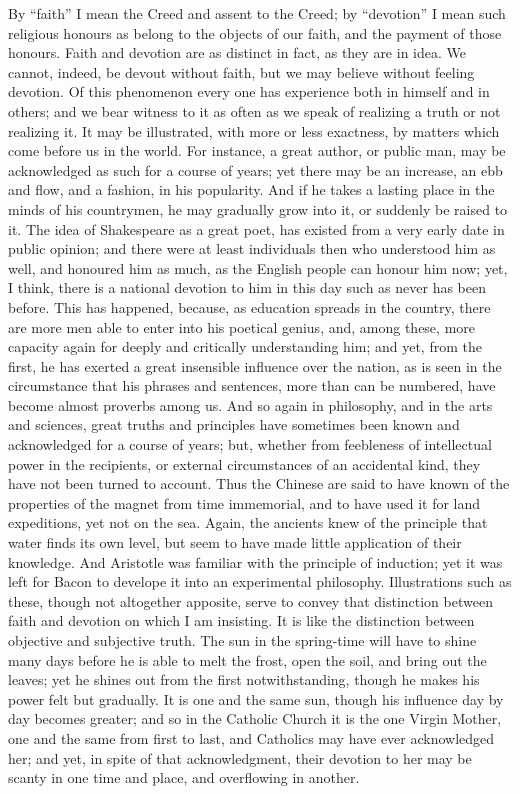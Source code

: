 By ``faith'' I mean the Creed and assent to the Creed; by
``devotion'' I mean such religious honours as belong to the
objects of our faith, and the payment of those honours. Faith and
devotion are as distinct in fact, as they are in idea. We cannot,
indeed, be devout without faith, but we may believe without feeling
devotion. Of this phenomenon every one has experience both in himself
and in others; and we bear witness to it as often as we speak of
realizing a truth or not realizing it. It may be illustrated, with more
or less exactness, by matters which come before us in the world. For
instance, a great author, or public man, may be acknowledged as such for
a course of years; yet there may be an increase, an ebb and flow, and a
fashion, in his popularity. And if he takes a lasting place in the
minds of his countrymen, he may gradually grow into it, or suddenly be
raised to it. The idea of Shakespeare as a great poet, has existed from
a very early date in public opinion; and there were at least individuals
then who understood him as well, and honoured him as much, as the
English people can honour him now; yet, I think, there is a national
devotion to him in this day such as never has been before. This has
happened, because, as education spreads in the country, there are more
men able to enter into his poetical genius, and, among these, more
capacity again for deeply and critically understanding him; and yet,
from the first, he has exerted a great insensible influence over the
nation, as is seen in the circumstance that his phrases and sentences,
more than can be numbered, have become almost proverbs among us. And so
again in philosophy, and in the arts and sciences, great truths and
principles have sometimes been known and acknowledged for a course of
years; but, whether from feebleness of intellectual power in the
recipients, or external circumstances of an accidental kind, they have
not been turned to account. Thus the Chinese are said to have known of
the properties of the magnet from time immemorial, and to have used it
for land expeditions, yet not on the sea. Again, the ancients knew of
the principle that water finds its own level, but seem to have made
little application of their knowledge. And Aristotle was familiar with
the principle of induction; yet it was left for Bacon to develope it
into an experimental philosophy. Illustrations such as these, though not
altogether apposite, serve to convey that distinction between faith
and devotion on which I am insisting. It is like the distinction between
objective and subjective truth. The sun in the spring-time will have to
shine many days before he is able to melt the frost, open the soil, and
bring out the leaves; yet he shines out from the first notwithstanding,
though he makes his power felt but gradually. It is one and the same
sun, though his influence day by day becomes greater; and so in the
Catholic Church it is the one Virgin Mother, one and the same from first
to last, and Catholics may have ever acknowledged her; and yet, in spite
of that acknowledgment, their devotion to her may be scanty in one time
and place, and overflowing in another.

